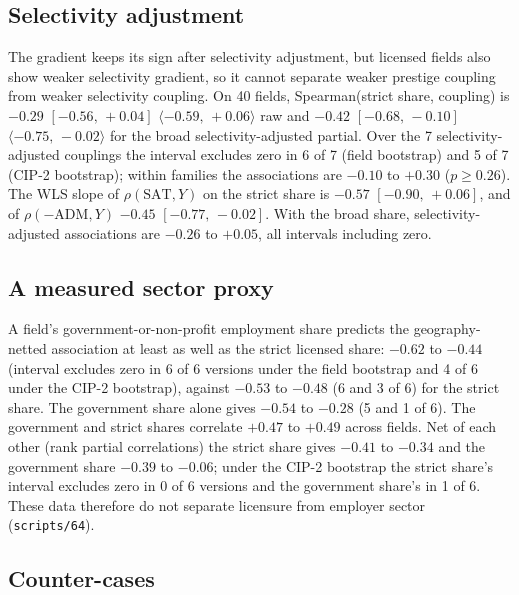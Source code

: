 \documentclass[11pt]{article}
\newcommand{\ci}[2]{$[#1,\allowbreak\,#2]$}
\newcommand{\cic}[2]{$\langle #1,\,#2\rangle$}
\newcommand{\scr}[1]{\texttt{scripts/#1}}
\begin{document}
\subsection{Selectivity adjustment}\label{sec:licsel}

The gradient keeps its sign after selectivity adjustment, but licensed fields also show weaker selectivity gradient, so it
cannot separate weaker prestige coupling from weaker selectivity coupling. On 40 fields, Spearman(strict share, coupling) is $-0.29$
\ci{-0.56}{+0.04} \cic{-0.59}{+0.06} raw and $-0.42$ \ci{-0.68}{-0.10} \cic{-0.75}{-0.02} for the broad selectivity-adjusted partial. Over the 7
selectivity-adjusted couplings the interval excludes zero in 6 of 7 (field bootstrap) and 5 of 7 (CIP-2 bootstrap); within
families the associations are $-0.10$ to $+0.30$ ($p\ge0.26$). The WLS slope of $\rho(\text{SAT},Y)$ on the strict share is $-0.57$
\ci{-0.90}{+0.06}, and of $\rho(-\text{ADM},Y)$ $-0.45$ \ci{-0.77}{-0.02}. With the broad share, selectivity-adjusted associations are
$-0.26$ to $+0.05$, all intervals including zero.

\subsection{A measured sector proxy}\label{sec:sector}

A field's government-or-non-profit employment share predicts the geography-netted association at least as well as the
strict licensed share: $-0.62$ to $-0.44$ (interval excludes zero in 6 of 6 versions under the field bootstrap and 4 of 6 under
the CIP-2 bootstrap), against $-0.53$ to $-0.48$ (6 and 3 of 6) for the strict share. The government share alone gives $-0.54$
to $-0.28$ (5 and 1 of 6). The government and strict shares correlate $+0.47$ to $+0.49$ across fields. Net of each other (rank
partial correlations) the strict share gives $-0.41$ to $-0.34$ and the government share $-0.39$ to $-0.06$; under the CIP-2
bootstrap the strict share's interval excludes zero in 0 of 6 versions and the government share's in 1 of 6. These data
therefore do not separate licensure from employer sector (\scr{64}).

\subsection{Counter-cases}\label{sec:counter}
\end{document}
